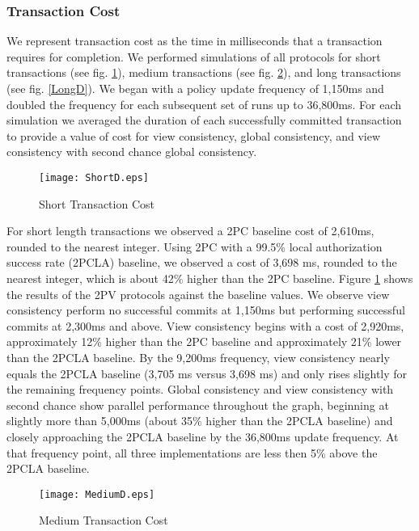 \documentclass[11pt]{article}
\begin{document}
\subsubsection{Transaction Cost}
We represent transaction cost as the time in milliseconds that a transaction requires for completion. We performed simulations of all protocols for short transactions (see fig. \ref{ShortD}), medium transactions (see fig. \ref{MediumD}), and long transactions (see fig. \ref{LongD}). We began with a policy update frequency of 1,150ms and doubled the frequency for each subsequent set of runs up to 36,800ms. For each simulation we averaged the duration of each successfully committed transaction to provide a value of cost for view consistency, global consistency, and view consistency with second chance global consistency.
\begin{figure}[h]
\begin{center}
\texttt{[image: ShortD.eps]}
\caption{Short Transaction Cost}
\label{ShortD}
\end{center}
\end{figure}

For short length transactions we observed a 2PC baseline cost of 2,610ms, rounded to the nearest integer. Using 2PC with a 99.5\% local authorization success rate (2PCLA) baseline, we observed a cost of 3,698 ms, rounded to the nearest integer, which is about 42\% higher than the 2PC baseline. Figure \ref{ShortD} shows the results of the 2PV protocols against the baseline values. We observe view consistency perform no successful commits at 1,150ms but performing successful commits at 2,300ms and above. View consistency begins with a cost of 2,920ms, approximately 12\% higher than the 2PC baseline and approximately 21\% lower than the 2PCLA baseline. By the 9,200ms frequency, view consistency nearly equals the 2PCLA baseline (3,705 ms versus 3,698 ms) and only rises slightly for the remaining frequency points. Global consistency and view consistency with second chance show parallel performance throughout the graph, beginning at slightly more than 5,000ms (about 35\% higher than the 2PCLA baseline) and closely approaching the 2PCLA baseline by the 36,800ms update frequency. At that frequency point, all three implementations are less then 5\% above the 2PCLA baseline.
\begin{figure}[h]
\begin{center}
\texttt{[image: MediumD.eps]}
\caption{Medium Transaction Cost}
\label{MediumD}
\end{center}
\end{figure}
\end{document}
